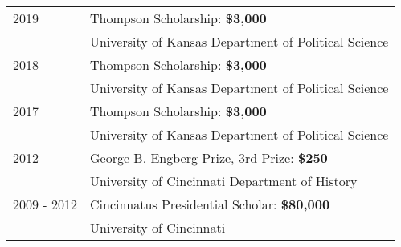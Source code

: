 \documentclass[margin,line,pifont,palatino,courier]{res}
\newenvironment{list1}{
  \begin{list}{\ding{113}}{%
      \setlength{\itemsep}{0in}
      \setlength{\parsep}{0in} \setlength{\parskip}{0in}
      \setlength{\topsep}{0in} \setlength{\partopsep}{0in}
      \setlength{\leftmargin}{0.17in}}}{\end{list}}
\begin{document}
\begin{resume}
\begin{tabular}{@{}p{0.8in}p{4in}}
2019       & Thompson Scholarship: \bf{\$3,000}\\
           & University of Kansas Department of Political Science \\
2018       & Thompson Scholarship: \bf{\$3,000}\\
           & University of Kansas Department of Political Science \\
2017       & Thompson Scholarship: \bf{\$3,000}\\
           & University of Kansas Department of Political Science \\
2012       & George B. Engberg Prize, 3rd Prize: \bf{\$250}  \\
           & University of Cincinnati Department of History  \\
2009 - 2012 & Cincinnatus Presidential Scholar: \bf{\$80,000}\\
           & University of Cincinnati \\
\end{tabular}






\end{resume}
\end{document}
